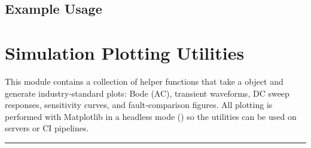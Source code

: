 \documentclass[letterpaper,10pt,english]{sphinxmanual}
\begin{document}
\section{Example Usage}
\label{\detokenize{parser:example-usage}}
\begin{sphinxVerbatim}[commandchars=\\\{\}]
  
   
  
   
  
\end{sphinxVerbatim}

\sphinxstepscope


\chapter{Simulation Plotting Utilities}
\label{\detokenize{plotting:simulation-plotting-utilities}}\label{\detokenize{plotting:plotting-module}}\label{\detokenize{plotting::doc}}
\sphinxAtStartPar
This module contains a collection of helper functions that take a
 object and generate industry‑standard plots:
Bode (AC), transient waveforms, DC sweep responses, sensitivity curves,
and fault‑comparison figures.  All plotting is performed with Matplotlib in a
headless mode () so the utilities can be used on servers or CI pipelines.


\bigskip\hrule\bigskip

\end{document}
